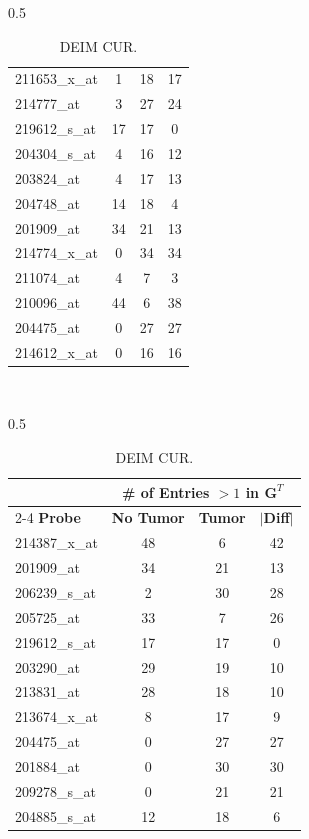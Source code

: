 \documentclass[12pt]{article}
\begin{document}
\begin{table}[H]
\begin{subtable}{0.5\linewidth}
\begin{tabular}{|l|c|c|c|}
        211653\_x\_at & 1 & 18 & 17 \\
        214777\_at & 3 & 27 & 24 \\
        219612\_s\_at & 17 & 17 & 0 \\
        204304\_s\_at & 4 & 16 & 12 \\
        203824\_at & 4 & 17 & 13 \\
        204748\_at & 14 & 18 & 4 \\
        201909\_at & 34 & 21 & 13 \\
        214774\_x\_at & 0 & 34 & 34 \\
        211074\_at & 4 & 7 & 3 \\
        210096\_at & 44 & 6 & 38 \\
        204475\_at & 0 & 27 & 27 \\
        214612\_x\_at & 0 & 16 & 16 \\ 
        \hline
    \end{tabular}
    \caption{DEIM CUR.}
    \end{subtable} \\ 
    \newline \quad \newline
    \begin{subtable}{0.5\linewidth}
    \centering
    \small
    \begin{tabular}{|l|c|c|c|}
        \hline
        & \multicolumn{3}{c|}{\textbf{\# of Entries $>1$ in $\mathbf{G}^T$}} \\ 
        \cline{2-4}
         \textbf{Probe} & \textbf{No Tumor} & \textbf{Tumor} & $|$\textbf{Diff}$|$ \\
        \hline
        214387\_x\_at & 48 & 6 & 42 \\
        201909\_at & 34 & 21 & 13 \\
        206239\_s\_at & 2 & 30 & 28 \\
        205725\_at & 33 & 7 & 26 \\
        219612\_s\_at & 17 & 17 & 0 \\
        203290\_at & 29 & 19 & 10 \\
        213831\_at & 28 & 18 & 10\\
        213674\_x\_at & 8 & 17 & 9 \\
        204475\_at & 0 & 27 & 27 \\
        201884\_at & 0 & 30 & 30 \\
        209278\_s\_at & 0 & 21 & 21 \\
        204885\_s\_at & 12 & 18 & 6 \\

\end{tabular}
\end{subtable}
\end{table}
\end{document}
